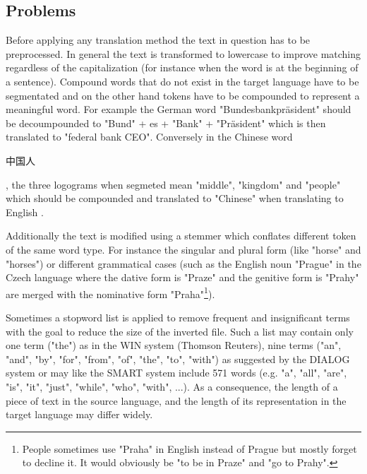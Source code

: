 \documentclass[journal]{IEEEtran}
\begin{document}
\subsection{Problems}
Before applying any translation method the text in question has to be preprocessed.
In general the text is transformed to lowercase to improve matching regardless of the capitalization (for instance when the word is at the beginning of a sentence).
Compound words that do not exist in the target language have to be segmentated and on the other hand tokens have to be compounded to represent a meaningful word.
For example the German word "Bundesbankpr\"{a}sident" should be decoumpounded to "Bund" + es + "Bank" + "Pr\"{a}sident" which is then translated to "federal bank CEO".
Conversely in the Chinese word \begin{CJK}{UTF8}{gbsn}中国人\end{CJK}, the three logograms when segmeted mean "middle", "kingdom" and "people" which should be compounded and translated to "Chinese" when translating to English \cite{ir13}.

Additionally the text is modified using a stemmer which conflates different token of the same word type.
For instance the singular and plural form (like "horse" and "horses") or different grammatical cases (such as the English noun "Prague" in the Czech language where the dative form is "Praze" and the genitive form is "Prahy" are merged with the nominative form "Praha"\footnote{People sometimes use "Praha" in English instead of Prague but mostly forget to decline it.
It would obviously be "to be in Praze" and "go to Prahy".}).

Sometimes a stopword list is applied to remove frequent and insignificant terms with the goal to reduce the size of the inverted file.
Such a list may contain only one term ("the") as in the WIN system (Thomson Reuters), nine terms ("an", "and", "by", "for", "from", "of", "the", "to", "with") as suggested by the DIALOG system or may like the SMART system include 571 words (e.g. "a", "all", "are", "is", "it", "just", "while", "who", "with", ...).
As a consequence, the length of a piece of text in the source language, and the length of its representation in the target language may differ widely.
\end{document}
